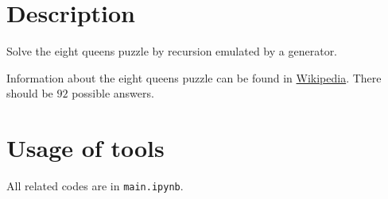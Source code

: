 \documentclass[english]{../../TeXTemplate/pkupaper}
\title{\titlemark}
\author{pppppass}
\date{February 24, 2018}
\begin{document}
\maketitle

\section{Description}

Solve the eight queens puzzle by recursion emulated by a generator.

Information about the eight queens puzzle can be found in \href{https://en.wikipedia.org/wiki/Eight_queens_puzzle}{Wikipedia}. There should be $92$ possible answers.

\section{Usage of tools}

All related codes are in \verb"main.ipynb".
\end{document}
